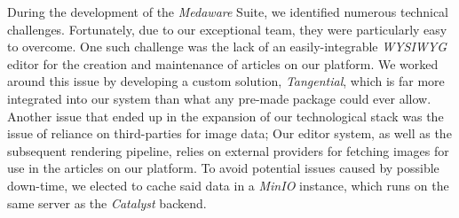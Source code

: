During the development of the \textit{Medaware} Suite, we identified numerous technical challenges. Fortunately, due to
our exceptional team, they were particularly easy to overcome.
One such challenge was the lack of an easily-integrable \textit{WYSIWYG} editor for the creation and maintenance of
articles on our platform. We worked around this issue by developing a custom solution, \textit{Tangential}, which is far more
integrated into our system than what any pre-made package could ever allow.
Another issue that ended up in the expansion of our technological stack was the issue of reliance on third-parties for image
data; Our editor system, as well as the subsequent rendering pipeline, relies on external providers for fetching images
for use in the articles on our platform. To avoid potential issues caused by possible down-time, we elected to cache said
data in a \textit{MinIO} instance, which runs on the same server as the \textit{Catalyst} backend.
